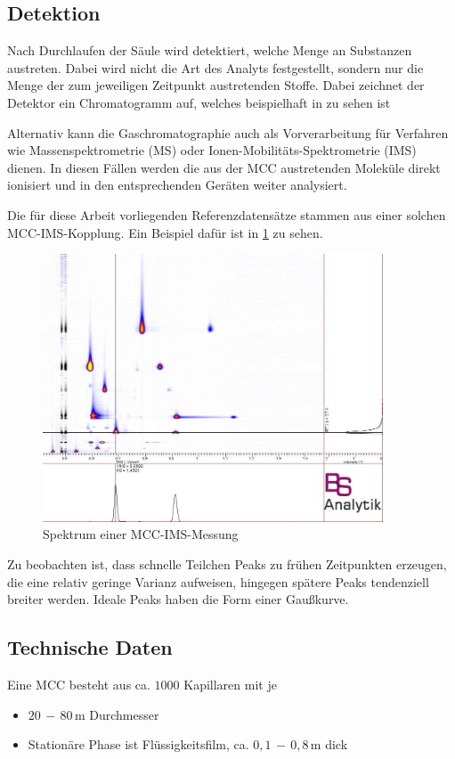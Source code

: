 \subsection{Detektion}
Nach Durchlaufen der Säule wird detektiert, welche Menge an Substanzen austreten. Dabei wird nicht die Art des Analyts festgestellt, sondern nur die Menge der zum jeweiligen Zeitpunkt austretenden Stoffe. Dabei zeichnet der Detektor ein Chromatogramm auf, welches beispielhaft in  zu sehen ist

Alternativ kann die Gaschromatographie auch als Vorverarbeitung für Verfahren wie Massenspektrometrie (MS) oder Ionen-Mobilitäts-Spektrometrie (IMS) dienen. In diesen Fällen werden die aus der MCC austretenden Moleküle direkt ionisiert und in den entsprechenden Geräten weiter analysiert.

Die für diese Arbeit vorliegenden Referenzdatensätze stammen aus einer solchen MCC-IMS-Kopplung. Ein Beispiel dafür ist in \ref{picture:Spektrum1} zu sehen. 
\begin{figure}
 \includegraphics[width = 0.9\textwidth]{bilder/BD15_1304101102_ims}
 \caption{Spektrum einer MCC-IMS-Messung}
 \label{picture:Spektrum1}
\end{figure}
%
Zu beobachten ist, dass schnelle Teilchen Peaks zu frühen Zeitpunkten erzeugen, die eine relativ geringe Varianz aufweisen, hingegen spätere Peaks tendenziell breiter werden. Ideale Peaks haben die Form einer Gaußkurve.


\subsection{Technische Daten}
Eine MCC besteht aus ca. $1000$ Kapillaren mit je
\begin{itemize}
 \item $20\,-\,80$\,\textmu m Durchmesser
 \item Stationäre Phase ist Flüssigkeitsfilm, ca. $0,1\,-\,0,8$\,\textmu m dick
\end{itemize}
 
